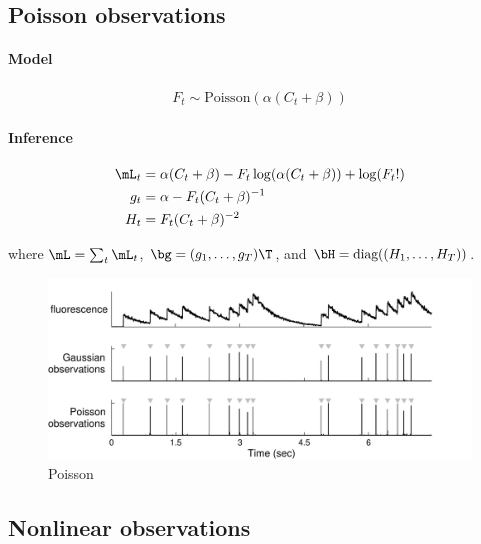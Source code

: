 \subsection{Poisson observations}
\paragraph{Model}

\begin{align}
	F_t \sim \text{Poisson}(\alpha (C_t + \beta))
\end{align}


\paragraph{Inference}

\begin{subequations} 
\begin{align}
\mL_{t} &= \alpha (C_t + \beta) - F_{t} \log(\alpha(C_t + \beta)) + \log(F_{t}!)  \\
g_{t} &= \alpha - F_{t}(C_t + \beta)^{-1} \\
H_{t} &= F_{t} (C_t + \beta)^{-2}
\end{align}
\end{subequations}

\noindent where $\mL=\sum_{t} \mL_{t}$, $\bg=(g_{1}, \ldots, g_{T})\T$, and $\bH=\text{diag}((H_1, \ldots, H_T))$.

\begin{figure}[h!]
\centering \includegraphics[width=.9\linewidth]{../figs/poisson}
\caption{Poisson} \label{fig:poiss}
\end{figure}


\subsection{Nonlinear observations}
